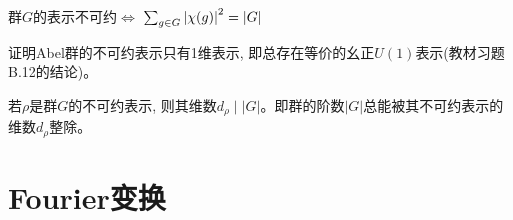 \begin{proposition}
    群$G$的表示不可约$\Longleftrightarrow$ $\sum_{g\in G}\qty|\chi(g)|^2=|G|$
\end{proposition}
\begin{exercise}[教材B.13]
    证明Abel群的不可约表示只有1维表示, 即总存在等价的幺正$U(1)$表示(教材习题B.12的结论)。
\end{exercise}
\begin{exercise}[教材B.14]
    若$\rho$是群$G$的不可约表示, 则其维数$d_\rho\mid |G|$。即群的阶数$|G|$总能被其不可约表示的维数$d_\rho$整除。
\end{exercise}

\section{Fourier变换}